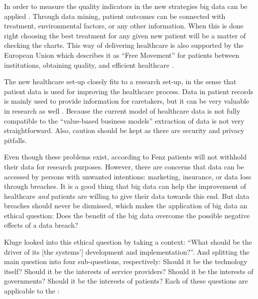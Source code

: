 In order to measure the quality indicators in the new strategies big data can be applied \cite{s6West2009}. 
Through data mining, patient outcomes can be connected with treatment, environmental factors, or any other information.
When this is done right choosing the best treatment for any given new patient will be a matter of checking the charts.
This way of delivering healthcare is also supported by the European Union which describes it as ``Free Movement'' for patients between institutions, obtaining quality, and efficient healthcare \cite{s8FernandezAleman2013}.

The new healthcare set-up closely fits to a research set-up, in the sense that patient data is used for improving the healthcare process.
Data in patient records is mainly used to provide information for caretakers, but it can be very valuable in research as well \cite{s15Fenz2014}.
Because the current model of healthcare data is not fully compatible to the ``value-based business models'' extraction of data is not very straightforward.
Also, caution should be kept as there are security and privacy pitfalls.

Even though these problems exist, according to Fenz \cite{s15Fenz2014} patients will not withhold their data for research purposes.
However, there are concerns that data can be accessed by persons with unwanted intentions: marketing, insurance, or data loss through breaches.
It is a good thing that big data can help the improvement of healthcare \emph{and} patients are willing to give their data towards this end.
But data breaches should never be dismissed, which makes the application of big data an ethical question: Does the benefit of the big data overcome the possible negative effects of a data breach?

Kluge \cite{s7Kluge2007} looked into this ethical question by taking a context: ``What should be the driver of its [the systems'] development and implementation?''. 
And splitting the main question into four sub-questions, respectively: Should it be the technology itself? Should it be the interests of service providers? Should it be the interests of governments? Should it be the interests of patients?
Each of these questions are applicable to the \project{}:

